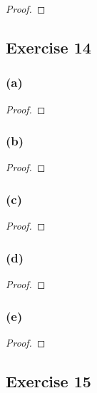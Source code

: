 \documentclass[14pt]{extarticle}
\begin{document}
\begin{proof}

\end{proof}

\subsection{Exercise 14}

\subsubsection{(a)}

\begin{proof}

\end{proof}

\subsubsection{(b)}

\begin{proof}

\end{proof}

\subsubsection{(c)}

\begin{proof}

\end{proof}

\subsubsection{(d)}

\begin{proof}

\end{proof}

\subsubsection{(e)}

\begin{proof}

\end{proof}

\subsection{Exercise 15}
\end{document}
